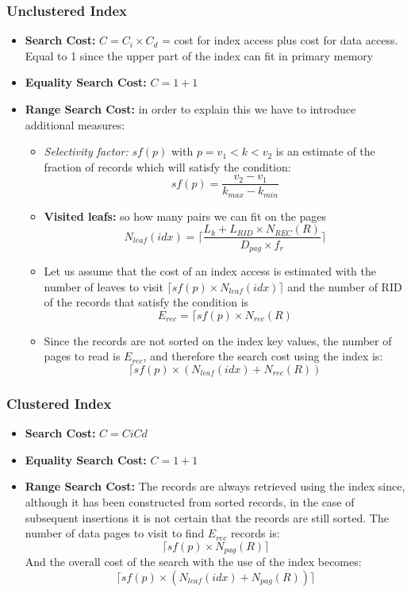 \subsubsection{Unclustered Index}
\begin{itemize}
    \item \textbf{Search Cost:} \(C = C_i \times C_d\) = cost for index access plus cost for data access. Equal to 1 since the upper part of the index can fit in primary memory
    \item \textbf{Equality Search Cost:} \(C = 1 + 1\)
    \item \textbf{Range Search Cost:} in order to explain this we have to introduce additional measures:
    \begin{itemize}
        \item \textit{Selectivity factor:} \(sf(p)\) with \(p = v_1 < k < v_2\) is an estimate of the fraction of records which will satisfy the condition:
        \[sf(p) = \frac{v_2 - v_1}{k_{max} - k_{min}}\]
        \item \textbf{Visited leafs:} so how many pairs we can fit on the pages
        \[N_{leaf}(idx) = \Bigg\lceil \frac{L_k + L_{RID} \times N_{REC}(R)}{D_{pag} \times f_r} \Bigg\rceil\]
        \item Let us assume that the cost of an index access is estimated with the number of leaves to visit \(\lceil sf(p) \times N_{leaf}(idx) \rceil\) and the number of RID of the records that satisfy the condition is
        \[E_{rec} = \lceil sf(p) \times N_{rec}(R)\]
        \item Since the records are not sorted on the index key values, the number of pages to read is \(E_{rec}\), and therefore the search cost using the index is:
        \[\lceil sf(p) \times (N_{leaf}(idx) + N_{rec}(R))\]
    \end{itemize}
\end{itemize}

\subsubsection{Clustered Index}
\begin{itemize}
    \item \textbf{Search Cost:} \(C = Ci  Cd\) 
    \item \textbf{Equality Search Cost:} \(C = 1 + 1\)
    \item \textbf{Range Search Cost:} The records are always retrieved using the index since, although it has been constructed from sorted records, in the case of subsequent insertions it is not certain that the records are still sorted. The number of data pages to visit to find \(E_{rec}\) records is:
    \[\lceil sf(p) \times N_{pag}(R) \rceil\]
    And the overall cost of the search with the use of the index becomes:
    \[\lceil sf(p) \times (N_{leaf}(idx) + N_{pag}(R)) \rceil\]
\end{itemize}